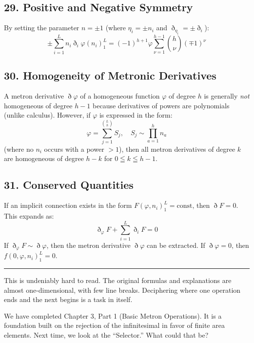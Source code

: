 \documentclass[11pt,a4paper,oneside]{article}
\newcommand{\hr}{\par\vspace{2em}\noindent\rule{\linewidth}{0.4pt}\par\vspace{2em}}
\begin{document}
\subsection{29. Positive and Negative Symmetry}
By setting the parameter $n = \pm 1$ (where $\eta_i = \pm n_i$ and $\eth_{\eta_i} = \pm \eth_i$):
\begin{equation*}
    \pm \sum_{i=1}^L n_i \eth_i \varphi(n_i)_1^L = (-1)^{h+1} \varphi \sum_{\nu=1}^{h-1} \binom{h}{\nu} (\mp 1)^\nu
\end{equation*}

\subsection{30. Homogeneity of Metronic Derivatives}
A metron derivative $\eth \varphi$ of a homogeneous function $\varphi$ of degree $h$ is generally \textit{not} homogeneous of degree $h-1$ because derivatives of powers are polynomials (unlike calculus).
However, if $\varphi$ is expressed in the form:
\begin{equation*}
    \varphi = \sum_{j=1}^{\binom{L}{h}} S_j, \quad S_j \sim \prod_{a=1}^h n_a
\end{equation*}
(where no $n_i$ occurs with a power $>1$), then all metron derivatives of degree $k$ are homogeneous of degree $h-k$ for $0 \leqq k \leqq h-1$.

\subsection{31. Conserved Quantities}
If an implicit connection exists in the form $F(\varphi, n_i)_1^L = \text{const}$, then $\eth F = 0$. This expands as:
\begin{equation*}
    \eth_\varphi F + \sum_{i=1}^L \eth_i F = 0
\end{equation*}
If $\eth_\varphi F \sim \eth \varphi$, then the metron derivative $\eth \varphi$ can be extracted. If $\eth \varphi = 0$, then $f(0, \varphi, n_i)_1^L = 0$.

\hr

\begin{reflectionbox}[title={Notes and Reflections: The Deciphering Task}]
This is undeniably hard to read. The original formulas and explanations are almost one-dimensional, with few line breaks. Deciphering where one operation ends and the next begins is a task in itself.

We have completed Chapter 3, Part 1 (Basic Metron Operations). It is a foundation built on the rejection of the infinitesimal in favor of finite area elements. Next time, we look at the ``Selector.'' What could that be?
\end{reflectionbox}
\end{document}
